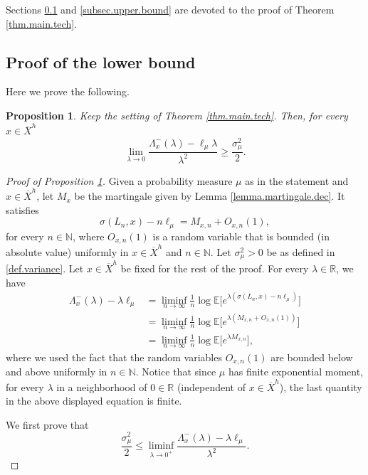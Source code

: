 \documentclass[10pt]{amsart}
\theoremstyle{plain}
\newtheorem{proposition}[theorem]{Proposition}
\theoremstyle{definition}
\newcommand\E{\mathbb{E}}
\newcommand\R{\mathbb{R}}
\newcommand\N{\mathbb{N}}
\begin{document}
Sections \ref{subsec.lower.bound} and \ref{subsec.upper.bound} are devoted to the proof of Theorem \ref{thm.main.tech}.

\subsection{Proof of the lower bound}\label{subsec.lower.bound}

Here we prove the following.
\begin{proposition}\label{prop.lower.bound}
Keep the setting of Theorem \ref{thm.main.tech}. Then, for every $x\in \overline{X}^h$
\[
\lim_{\lambda \to 0} \frac{\Lambda_x^-(\lambda)-\ell_\mu \lambda }{\lambda^2} \geq \frac{\sigma^2_{\mu}}{2} .
\]
\end{proposition}

\begin{proof}[Proof of Proposition \ref{prop.lower.bound}]

Given a probability measure $\mu$ as in the statement and $x \in \overline{X}^h$, let $M_{x}$ be the martingale given by Lemma \ref{lemma.martingale.dec}. It satisfies
\[
\sigma(L_n,x)-n\ell_\mu=M_{x,n}+O_{x,n}(1),
\]
for every $n \in \N$, where $O_{x,n}(1)$ is a random variable that is bounded (in absolute value) uniformly in $x \in \overline{X}^h$ and $n\in \N$. Let $\sigma_\mu^2>0$ be as defined in \eqref{def.variance}. Let $x \in \overline{X}^h$ be fixed for the rest of the proof. For every $\lambda \in \R$, we have
\begin{align*}\label{observe}
\Lambda_x^-(\lambda)-\lambda \ell_{\mu} & =  \liminf_{n \to \infty}\frac{1}{n}\log \E\bigl[e^{\lambda (\sigma(L_n,x) - n\ell_{\mu})}\bigr]\\
& = \liminf_{n \to \infty} \frac{1}{n}\log \E\bigl[e^{\lambda(M_{x,n} +O_{x,n}(1))}\bigr]\\
& = \liminf_{n \to \infty} \frac{1}{n}\log \E\bigl[e^{\lambda M_{x,n}}\bigr], \end{align*}
where we used the fact that the random variables $O_{x,n}(1)$ are bounded below and above uniformly in $n \in \N$. Notice that since $\mu$ has finite exponential moment, for every $\lambda$ in a neighborhood of $0 \in \R$ (independent of $x \in \overline{X}^h$), the last quantity in the above displayed equation is finite.

We first prove that
\begin{equation}\label{eq.main0}
\frac{\sigma_{\mu}^2}{2}\leq \liminf_{\lambda\to 0^+}{\frac{\Lambda_x^-(\lambda)-\lambda \ell_{\mu}}{\lambda^2}}.
\end{equation}


\end{proof}
\end{document}
